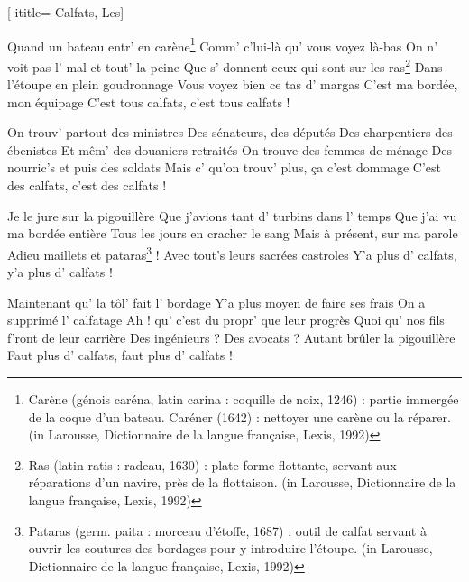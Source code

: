  [
ititle= {Calfats, Les}]


\beginverse
Quand un bateau entr' en carène\footnote {Carène (génois caréna, latin carina : coquille de noix, 1246) : partie immergée de la coque d'un bateau. Caréner (1642) : nettoyer une carène ou la réparer. (in Larousse, Dictionnaire de la langue
française, Lexis, 1992)}
Comm' c'lui-là qu' vous voyez là-bas
On n' voit pas l' mal et tout' la peine
Que s' donnent ceux qui sont sur les ras\footnote{ Ras (latin ratis : radeau, 1630) : plate-forme flottante, servant aux réparations d'un navire, près de la flottaison. (in Larousse, Dictionnaire de la langue française, Lexis, 1992)}
Dans l'étoupe en plein goudronnage
Vous voyez bien ce tas d' margas
C'est ma bordée, mon équipage
C'est tous calfats, c'est tous calfats !
\endverse

\beginverse
On trouv' partout des ministres
Des sénateurs, des députés
Des charpentiers des ébenistes
Et mêm' des douaniers retraités
On trouve des femmes de ménage
Des nourric's et puis des soldats
Mais c' qu'on trouv' plus, ça c'est dommage
C'est des calfats, c'est des calfats !
\endverse

\beginverse
Je le jure sur la pigouillère
Que j'avions tant d' turbins dans l' temps
Que j'ai vu ma bordée entière
Tous les jours en cracher le sang
Mais à présent, sur ma parole
Adieu maillets et pataras\footnote {Pataras (germ. paita : morceau d'étoffe, 1687) : outil de calfat servant à ouvrir les coutures des
bordages pour y introduire l'étoupe. (in Larousse, Dictionnaire de la langue française, Lexis, 1992)} !
Avec tout's leurs sacrées castroles
Y'a plus d' calfats, y'a plus d' calfats !
\endverse

\beginverse
Maintenant qu' la tôl' fait l' bordage
Y'a plus moyen de faire ses frais
On a supprimé l' calfatage
Ah ! qu' c'est du propr' que leur progrès
Quoi qu' nos fils f'ront de leur carrière
Des ingénieurs ? Des avocats ?
Autant brûler la pigouillère
Faut plus d' calfats, faut plus d' calfats !
\endverse

\endsong